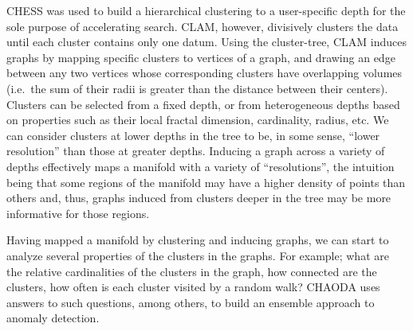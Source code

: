 CHESS was used to build a hierarchical clustering to a user-specific depth for the sole purpose of accelerating search.
CLAM, however, divisively clusters the data until each cluster contains only one datum.
Using the cluster-tree, CLAM induces graphs by mapping specific clusters to vertices of a graph, and drawing an edge between any two vertices whose corresponding clusters have overlapping volumes (i.e.\ the sum of their radii is greater than the distance between their centers).
Clusters can be selected from a fixed depth, or from heterogeneous depths based on properties such as their local fractal dimension, cardinality, radius, etc.
We can consider clusters at lower depths in the tree to be, in some sense, ``lower resolution'' than those at greater depths.
Inducing a graph across a variety of depths effectively maps a manifold with a variety of ``resolutions'', the intuition being that some regions of the manifold may have a higher density of points than others and, thus, graphs induced from clusters deeper in the tree may be more informative for those regions.

Having mapped a manifold by clustering and inducing graphs, we can start to analyze several properties of the clusters in the graphs.
For example; what are the relative cardinalities of the clusters in the graph, how connected are the clusters, how often is each cluster visited by a random walk?
CHAODA uses answers to such questions, among others, to build an ensemble approach to anomaly detection.
